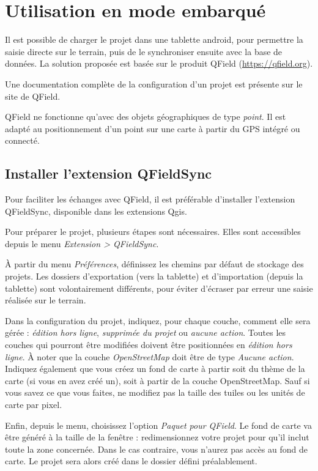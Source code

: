 \section{Utilisation en mode embarqué}

Il est possible de charger le projet dans une tablette android, pour permettre la saisie directe sur le terrain, puis de le synchroniser ensuite avec la base de données. La solution proposée est basée sur le produit QField (\href{https://qfield.org/}{https://qfield.org}).

Une documentation complète de la configuration d'un projet est présente sur le site de QField.

QField ne fonctionne qu'avec des objets géographiques de type \textit{point}. Il est adapté au positionnement d'un point sur une carte à partir du GPS intégré ou connecté.

\subsection{Installer l'extension QFieldSync}

Pour faciliter les échanges avec QField, il est préférable d'installer l'extension QFieldSync, disponible dans les extensions Qgis. 

Pour préparer le projet, plusieurs étapes sont nécessaires. Elles sont accessibles depuis le menu \textit{Extension > QFieldSync}.

À partir du menu \textit{Préférences}, définissez les chemins par défaut de stockage des projets. Les dossiers d'exportation (vers la tablette) et d'importation (depuis la tablette) sont volontairement différents, pour éviter d'écraser par erreur une saisie réalisée sur le terrain.

Dans la configuration du projet, indiquez, pour chaque couche, comment elle sera gérée : \textit{édition hors ligne}, \textit{supprimée du projet} ou \textit{aucune action}. 
Toutes les couches qui pourront être modifiées doivent être positionnées en \textit{édition hors ligne}.
À noter que la couche \textit{OpenStreetMap} doit être de type \textit{Aucune action}. 
Indiquez également que vous créez un fond de carte à partir soit du thème de la carte (si vous en avez créé un), soit à partir de la couche OpenStreetMap. Sauf si vous savez ce que vous faites, ne modifiez pas la taille des tuiles ou les unités de carte par pixel.

Enfin, depuis le menu, choisissez l'option \textit{Paquet pour QField}. Le fond de carte va être généré à la taille de la fenêtre : redimensionnez votre projet pour qu'il inclut toute la zone concernée. Dans le cas contraire, vous n'aurez pas accès au fond de carte. Le projet sera alors créé dans le dossier défini préalablement.


